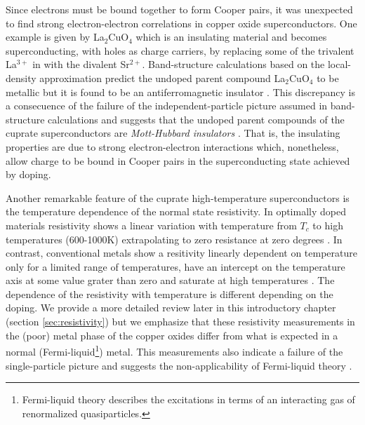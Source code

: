 Since electrons must be bound together to form Cooper pairs, it was unexpected to find strong electron-electron correlations in copper oxide superconductors. 
One example is given by La$_2$CuO$_4$ which is an insulating material and becomes superconducting, with holes as charge carriers, by replacing some of the trivalent La$^{3+}$ in with the divalent Sr$^{2+}$. 
Band-structure calculations based on the local-density approximation predict the undoped parent compound La$_2$CuO$_4$ to be metallic but it is found to be an antiferromagnetic insulator \cite{Timusk1999}.
This discrepancy is a consecuence of the failure of the independent-particle picture assumed in band-structure calculations and suggests that the undoped parent compounds of the cuprate superconductors are \textit{Mott-Hubbard insulators} \cite{Mott1949}.
That is, the insulating properties are due to strong electron-electron interactions which, nonetheless, allow charge to be bound in Cooper pairs in the superconducting state achieved by doping.

Another remarkable feature of the cuprate high-temperature superconductors is the temperature dependence of the normal state resistivity.
In optimally doped materials resistivity shows a linear variation with temperature from $T_c$ to high temperatures (600-1000K) extrapolating to zero resistance at zero degrees \cite{Gurvitch1987}.
In contrast, conventional metals show a resitivity linearly dependent on temperature only for a limited range of temperatures, have an intercept on the temperature axis at some value grater than zero and saturate at high temperatures \cite{Timusk1999}.
The dependence of the resistivity with temperature is different depending on the doping. 
We provide a more detailed review later in this introductory chapter (section \ref{sec:resistivity}) but we emphasize that these resistivity measurements in the (poor) metal phase of the copper oxides differ from what is expected in a normal (Fermi-liquid\footnote{Fermi-liquid theory describes the excitations in terms of an interacting gas of renormalized quasiparticles.}) metal.
This measurements also indicate a failure of the single-particle picture and suggests the non-applicability of Fermi-liquid theory \cite{Orenstein2000}.

